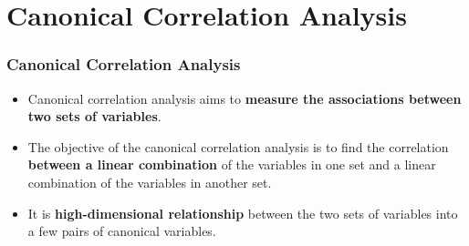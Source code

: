\documentclass[10pt]{beamer} %
\begin{document}
\section{Canonical Correlation Analysis}

\begin{frame}
	\frametitle{Canonical Correlation Analysis}
	\begin{itemize}
      \item Canonical correlation analysis aims to \textbf{measure the
         associations between two sets of variables}. 
         \vspace{0.25cm}

      \item The objective of the canonical correlation analysis is to find the
         correlation \textbf{between a linear combination} of the variables in
         one set and a linear combination of the variables in another set. 
         \vspace{0.25cm}

      \item It is \textbf{high-dimensional relationship} between the two sets of
         variables into a few pairs of canonical variables. 
	\end{itemize}
\end{frame}

% 	
% 	
\end{document}
